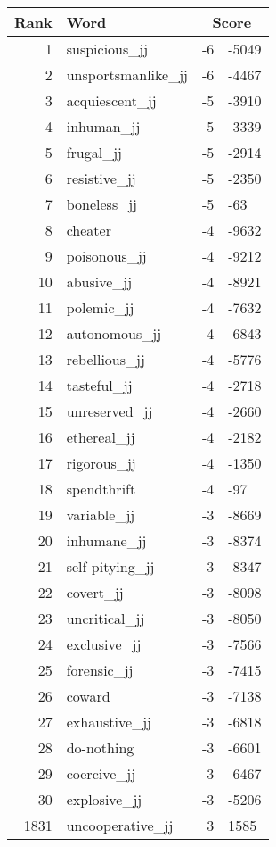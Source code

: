 \begin{longtable}[!htbp]{| rlr@{.}l |}
    \hline
    \textbf{Rank} & \textbf{Word} & \multicolumn{2}{c|}{\textbf{Score}} \\
    \hline
    \endhead
    1 & suspicious\_jj & -6 & -5049 \\
    2 & unsportsmanlike\_jj & -6 & -4467 \\
    3 & acquiescent\_jj & -5 & -3910 \\
    4 & inhuman\_jj & -5 & -3339 \\
    5 & frugal\_jj & -5 & -2914 \\
    6 & resistive\_jj & -5 & -2350 \\
    7 & boneless\_jj & -5 & -63 \\
    8 & cheater & -4 & -9632 \\
    9 & poisonous\_jj & -4 & -9212 \\
    10 & abusive\_jj & -4 & -8921 \\
    11 & polemic\_jj & -4 & -7632 \\
    12 & autonomous\_jj & -4 & -6843 \\
    13 & rebellious\_jj & -4 & -5776 \\
    14 & tasteful\_jj & -4 & -2718 \\
    15 & unreserved\_jj & -4 & -2660 \\
    16 & ethereal\_jj & -4 & -2182 \\
    17 & rigorous\_jj & -4 & -1350 \\
    18 & spendthrift & -4 & -97 \\
    19 & variable\_jj & -3 & -8669 \\
    20 & inhumane\_jj & -3 & -8374 \\
    21 & self-pitying\_jj & -3 & -8347 \\
    22 & covert\_jj & -3 & -8098 \\
    23 & uncritical\_jj & -3 & -8050 \\
    24 & exclusive\_jj & -3 & -7566 \\
    25 & forensic\_jj & -3 & -7415 \\
    26 & coward & -3 & -7138 \\
    27 & exhaustive\_jj & -3 & -6818 \\
    28 & do-nothing & -3 & -6601 \\
    29 & coercive\_jj & -3 & -6467 \\
    30 & explosive\_jj & -3 & -5206 \\
    1831 & uncooperative\_jj & 3 & 1585 \\

\end{longtable}
